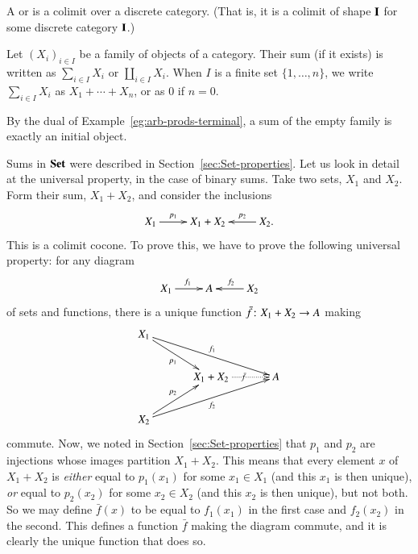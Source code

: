 \begin{defn}
A %
%
%
or %
%
%
is a colimit over a discrete category.  (That is, it is a colimit of shape
$\mathbf{I}$ for some discrete category $\mathbf{I}$.)
\end{defn}
%
Let $(X_i)_{i \in I}$ be a family of objects of a category.  Their sum (if
it exists) is written as $\sum_{i \in I} X_i$%
%
%
or $\coprod_{i \in I} X_i$.%
%
%
When
$I$ is a finite set $\{1, \ldots, n\}$, we write $\sum_{i \in I} X_i$ as $X_1
+ \cdots + X_n$,%
%
%
or as $0$%
%
%
if $n = 0$.

\begin{example}
\label{eg:sums-init}
By the dual of Example~\ref{eg:arb-prods-terminal}, a sum of the empty%
%
%
%
%
family is exactly an initial%
%
%
object.
\end{example}

\begin{example}
Sums in $\mathbf{Set}$%
%
%
were described in Section~\ref{sec:Set-properties}.  Let us look in detail
at the universal property, in the case of binary sums.  Take two sets,
$X_1$ and $X_2$.  Form their sum, $X_1 + X_2$, and consider the inclusions
\[
\xymatrix{
X_1 \ar[r]^-{p_1} &X_1 + X_2     &X_2. \ar[l]_-{p_2}
}
\]
This is a colimit cocone.  To prove this, we have to prove the
following universal property: for any diagram
\[
\xymatrix{
X_1 \ar[r]^{f_1} &A     & X_2 \ar[l]_{f_2}
}
\]
of sets and functions, there is a unique function $\bar{f}\from X_1 + X_2 \to
A$ making
\[
\xymatrix@C+2ex{
X_1 \ar[rrd]^{f_1} \ar[rd]_{p_1}        &       &       \\
        &
X_1 + X_2 \ar@{.>}[r]|{\bar{f}}   &A   \\
X_2 \ar[ru]^{p_2} \ar[rru]_{f_2}
}
\]
commute.  Now, we noted in Section~\ref{sec:Set-properties} that $p_1$ and
$p_2$ are injections whose images partition $X_1 + X_2$.  This means that
every element $x$ of $X_1 + X_2$ is \emph{either} equal to $p_1(x_1)$ for
some $x_1 \in X_1$ (and this $x_1$ is then unique), \emph{or} equal to
$p_2(x_2)$ for some $x_2 \in X_2$ (and this $x_2$ is then unique), but not
both.  So we may define $\bar{f}(x)$ to be equal to $f_1(x_1)$ in the first
case and $f_2(x_2)$ in the second.  This defines a function $\bar{f}$
making the diagram commute, and it is clearly the unique function that does
so.
\end{example}

